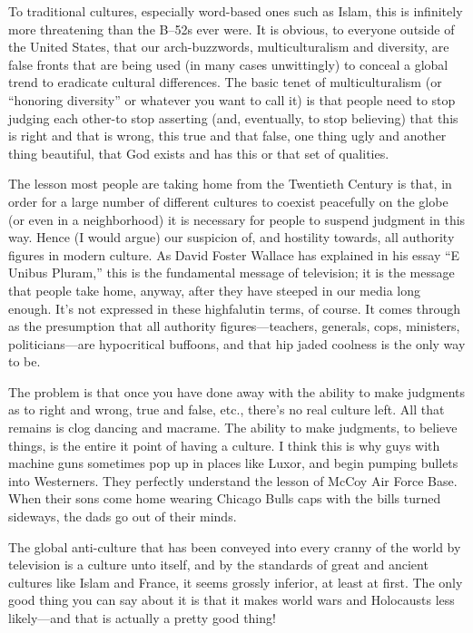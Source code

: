 \documentclass[
  fontsize=11pt,
  paper=landscape,
  twocolumn=true,
  pagesize=pdftex,
  headings=small,
  DIV=15,
  ]{scrartcl}
\begin{document}
To traditional cultures, especially word-based ones such as Islam, this
is infinitely more threatening than the B--52s ever were. It is obvious,
to everyone outside of the United States, that our arch-buzzwords,
multiculturalism and diversity, are false fronts that are being used (in
many cases unwittingly) to conceal a global trend to eradicate cultural
differences. The basic tenet of multiculturalism (or ``honoring
diversity'' or whatever you want to call it) is that people need to stop
judging each other-to stop asserting (and, eventually, to stop
believing) that this is right and that is wrong, this true and that
false, one thing ugly and another thing beautiful, that God exists and
has this or that set of qualities.

The lesson most people are taking home from the Twentieth Century is
that, in order for a large number of different cultures to coexist
peacefully on the globe (or even in a neighborhood) it is necessary for
people to suspend judgment in this way. Hence (I would argue) our
suspicion of, and hostility towards, all authority figures in modern
culture. As David Foster Wallace has explained in his essay ``E Unibus
Pluram,'' this is the fundamental message of television; it is the
message that people take home, anyway, after they have steeped in our
media long enough. It's not expressed in these highfalutin terms, of
course. It comes through as the presumption that all authority
figures---teachers, generals, cops, ministers, politicians---are
hypocritical buffoons, and that hip jaded coolness is the only way to
be.

The problem is that once you have done away with the ability to make
judgments as to right and wrong, true and false, etc., there's no real
culture left. All that remains is clog dancing and macrame. The ability
to make judgments, to believe things, is the entire it point of having a
culture. I think this is why guys with machine guns sometimes pop up in
places like Luxor, and begin pumping bullets into Westerners. They
perfectly understand the lesson of McCoy Air Force Base. When their sons
come home wearing Chicago Bulls caps with the bills turned sideways, the
dads go out of their minds.

The global anti-culture that has been conveyed into every cranny of the
world by television is a culture unto itself, and by the standards of
great and ancient cultures like Islam and France, it seems grossly
inferior, at least at first. The only good thing you can say about it is
that it makes world wars and Holocausts less likely---and that is
actually a pretty good thing!
\end{document}

